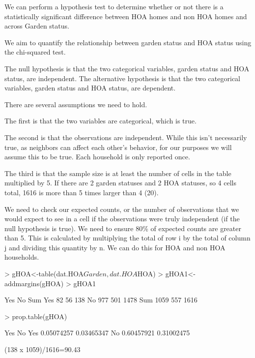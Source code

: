 \documentclass{article}
\begin{document}
We can perform a hypothesis test to determine whether or not there is a statistically significant difference between HOA homes and non HOA homes and across Garden status. 

We aim to quantify the relationship between garden status and HOA status using the chi-squared test.

The null hypothesis is that the two categorical variables, garden status and HOA status, are independent.
The alternative hypothesis is that the two categorical variables, garden status and HOA status, are dependent. 

There are several assumptions we need to hold. 

The first is that the two variables are categorical, which is true.

The second is that the observations are independent. While this isn't necessarily true, as neighbors can affect each other's behavior, for our purposes we will assume this to be true. Each household is only reported once. 

The third is that the sample size is at least the number of cells in the table multiplied by 5. If there are 2 garden statuses and 2 HOA statuses, so 4 cells total, 1616 is more than 5 times larger than 4 (20). 

We need to check our expected counts, or the number of observations that we would expect to see in a cell if the observations were truly independent (if the null hypothesis is true). We need to ensure 80\% of expected counts are greater than 5. This is calculated by multiplying the total of row i by the total of column j and dividing this quantity by n. We can do this for HOA and non HOA households. 

\begin{Schunk}
\begin{Sinput}
> gHOA<-table(dat.HOA$Garden,dat.HOA$HOA)
> gHOA1<-addmargins(gHOA)
> gHOA1
\end{Sinput}
\begin{Soutput}
       Yes   No  Sum
  Yes   82   56  138
  No   977  501 1478
  Sum 1059  557 1616
\end{Soutput}
\begin{Sinput}
> prop.table(gHOA)
\end{Sinput}
\begin{Soutput}
             Yes         No
  Yes 0.05074257 0.03465347
  No  0.60457921 0.31002475
\end{Soutput}
\end{Schunk}
(138 x 1059)/1616=90.43
\end{document}
